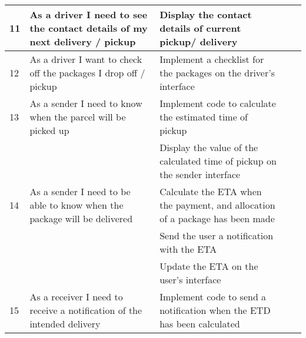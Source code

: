 \documentclass[paper=a4, fontsize=11pt]{scrartcl} %
\numberwithin{equation}{section} %
\numberwithin{figure}{section} %
\numberwithin{table}{section} %
\begin{document}
\begin{table}[]
\begin{tabular}{|p{1cm}|p{4cm}|p{4cm}|p{2cm}|p{2cm}|}
11          & As a driver I need to see the contact details of my next delivery / pickup & Display the contact details of current pickup/ delivery                                          &               &                     \\ \hline
12          & As a driver I want to check off the packages I drop off / pickup           & Implement a checklist for the packages on the driver's interface                                 &               &                     \\ \hline
13          & As a sender I need to know when the parcel will be picked up               & Implement code to calculate the estimated time of pickup                                         &               &                     \\ \hline
            &                                                                            & Display the value of the calculated time of pickup on the sender interface                       &               &                     \\ \hline
14          & As a sender I need to be able to know when the package will be delivered   & Calculate the ETA when the payment, and allocation of a package has been made                    &               &                     \\ \hline
            &                                                                            & Send the user a notification with the ETA                                                        &               &                     \\ \hline
            &                                                                            & Update the ETA on the user's interface                                                           &               &                     \\ \hline
15          & As a receiver I need to receive a notification of the intended delivery    & Implement code to send a notification when the ETD has been calculated                           &               &                     \\  \hline
\end{tabular}
\end{table}
\end{document}
